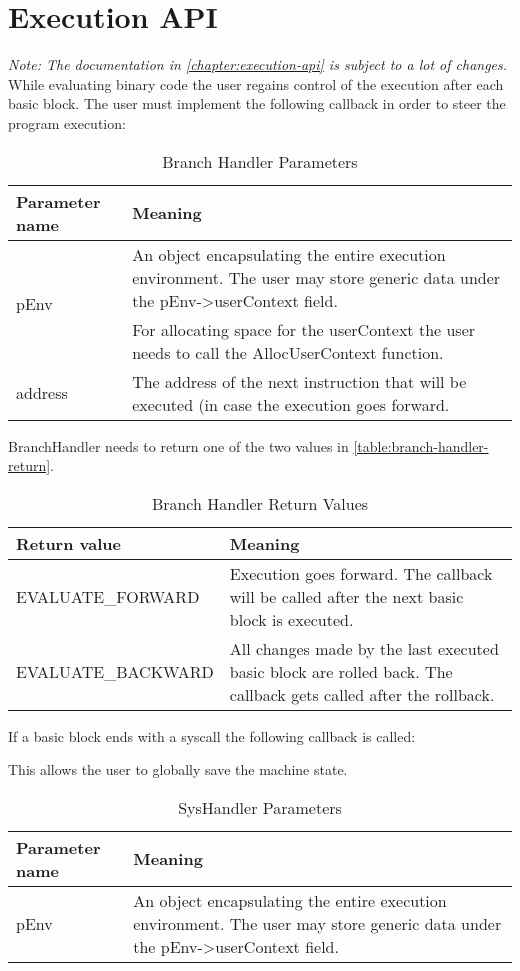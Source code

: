 \documentclass[12pt]{report}
\begin{document}
\chapter{Execution API}
\label{chapter:execution-api}
\textit{Note: The documentation in \autoref{chapter:execution-api} is subject to a lot of changes.}\\
While evaluating binary code the user regains control of the execution after each basic block. The user must implement the following callback in order to steer the program execution:

\begin{table}[H]
	\begin{tabular}{| p{6cm} | p{10cm} |}
		\hline
		\textbf{Parameter name} & \textbf{Meaning}\\ \hline
		\multirow{2}{*}{pEnv} & An object encapsulating the entire execution environment. The user may store generic data under the pEnv->userContext field.\\
		& For allocating space for the userContext the user needs to call the AllocUserContext function.\\ \hline
		address & The address of the next instruction that will be executed (in case the execution goes forward.\\ \hline
	\end{tabular}
	\caption{Branch Handler Parameters}
	\label{table:branch-handler-parameters}
\end{table}
BranchHandler needs to return one of the two values in \autoref{table:branch-handler-return}.\\
\begin{table}[H]
	\begin{tabular}{| p{6cm} | p{10cm} |}
		\hline
		\textbf{Return value} & \textbf{Meaning}\\ \hline
		EVALUATE_FORWARD & Execution goes forward. The callback will be called after the next basic block is executed.\\ \hline
		EVALUATE_BACKWARD & All changes made by the last executed basic block are rolled back. The callback gets called after the rollback.\\ \hline
	\end{tabular}
	\label{table:branch-handler-return}
	\caption{Branch Handler Return Values}
\end{table}
If a basic block ends with a syscall the following callback is called:

This allows the user to globally save the machine state.\\
\begin{table}[H]
	\begin{tabular}{| p{6cm} | p{10cm} |}
		\hline
		\textbf{Parameter name} & \textbf{Meaning}\\ \hline
		pEnv & An object encapsulating the entire execution environment. The user may store generic data under the pEnv->userContext field.\\ \hline
	\end{tabular}
	\caption{SysHandler Parameters}
	\label{table:syshandler-parameters}
\end{table}

\appendix
\end{document}
